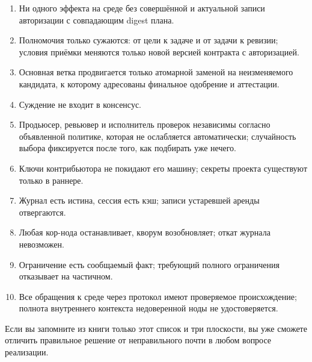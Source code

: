 \begin{enumerate}[label=I\arabic*.,leftmargin=2.6em]
\item Ни одного эффекта на среде без совершённой и актуальной записи авторизации с совпадающим digest плана.
\item Полномочия только сужаются: от цели к задаче и от задачи к ревизии; условия приёмки меняются только новой версией контракта с авторизацией.
\item Основная ветка продвигается только атомарной заменой на неизменяемого кандидата, к которому адресованы финальное одобрение и аттестации.
\item Суждение не входит в консенсус.
\item Продьюсер, ревьювер и исполнитель проверок независимы согласно объявленной политике, которая не ослабляется автоматически; случайность выбора фиксируется после того, как подбирать уже нечего.
\item Ключи контрибьютора не покидают его машину; секреты проекта существуют только в раннере.
\item Журнал есть истина, сессия есть кэш; записи устаревшей аренды отвергаются.
\item Любая кор-нода останавливает, кворум возобновляет; откат журнала невозможен.
\item Ограничение есть сообщаемый факт; требующий полного ограничения отказывает на частичном.
\item Все обращения к среде через протокол имеют проверяемое происхождение; полнота внутреннего контекста недоверенной ноды не удостоверяется.
\end{enumerate}

Если вы запомните из книги только этот список и три плоскости, вы уже сможете отличить правильное решение от неправильного почти в любом вопросе реализации.

